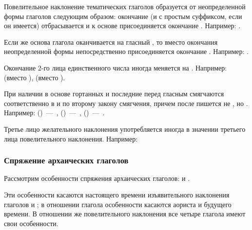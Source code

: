 \documentclass[11pt,a4paper,oneside]{memoir}
\begin{document}
    Повелительное наклонение тематических глаголов образуется от неопределенной формы глаголов следующим образом: окончание {} (и с простым суффиксом, если он имеется) отбрасывается и к основе присоединяется окончание {}. Например: {}.
    
    Если же основа глагола оканчивается на гласный {}, то вместо окончания неопределенной формы {} непосредственно присоединяется окончание {}. Например: {}.
    
    Окончание 2-го лица единственного числа {} иногда меняется на {}. Например: {} (вместо {}), {} (вместо {}).
    
    При наличии в основе гортанных {} и {} последние перед гласным {} смягчаются соответственно в {} и {} по второму закону смягчения, причем после {} пишется не {}, но {}. Например: {} ({})~---~{}, {} ({})~---~{}, {} ({})~---~{}.
    
    Третье лицо желательного наклонения употребляется иногда в значении третьего лица повелительного наклонения. Например:
    
    \bigskip{}

                \subsubsection{Спряжение архаических глаголов}

    Рассмотрим особенности спряжения архаических глаголов: {} и {}.
    
    Эти особенности касаются настоящего времени изъявительного наклонения глаголов {} и {}; в отношении глагола {} особенности касаются аориста и будущего времени. В отношении же повелительного наклонения все четыре глагола имеют свои особенности.
\end{document}
